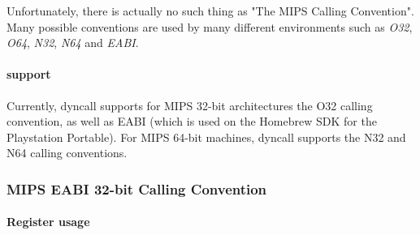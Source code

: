 Unfortunately, there is actually no such thing as "The MIPS Calling Convention".  Many possible conventions are used
by many different environments such as \emph{O32}\cite{MIPSo32}, \emph{O64}, \emph{N32}, \emph{N64} and \emph{EABI}.\\

\paragraph{ support}

Currently, dyncall supports for MIPS 32-bit architectures the O32 calling convention, as well as EABI (which is used on the Homebrew SDK for
the Playstation Portable). For MIPS 64-bit machines, dyncall supports the N32 and N64 calling conventions.

\subsubsection{MIPS EABI 32-bit Calling Convention}

\paragraph{Register usage}

